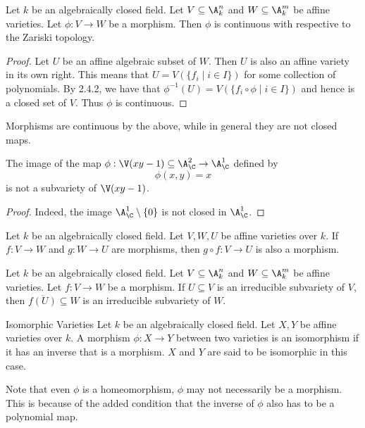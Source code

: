 \documentclass[a4paper]{article}
\begin{document}
\begin{prp}{}{} Let $k$ be an algebraically closed field. Let $V\subseteq\A_k^n$ and $W\subseteq\A_k^m$ be affine varieties. Let $\phi:V\to W$ be a morphism. Then $\phi$ is continuous with respective to the Zariski topology. \tcbline
\begin{proof}
Let $U$ be an affine algebraic subset of $W$. Then $U$ is also an affine variety in its own right. This means that $U=V(\{f_i\;|\;i\in I\})$ for some collection of polynomials. By 2.4.2, we have that $\phi^{-1}(U)=V(\{f_i\circ\phi\;|\;i\in I\})$ and hence is a closed set of $V$. Thus $\phi$ is continuous. 
\end{proof}
\end{prp}

Morphisms are continuous by the above, while in general they are not closed maps. 

\begin{eg}{}{} The image of the map $\phi:\V(xy-1)\subseteq\A_\C^2\to\A_\C^1$ defined by $$\phi(x,y)=x$$ is not a subvariety of $\V(xy-1)$. \tcbline
\begin{proof}
Indeed, the image $\A_\C^1\setminus\{0\}$ is not closed in $\A_\C^1$.
\end{proof}
\end{eg}

\begin{prp}{}{} Let $k$ be an algebraically closed field. Let $V,W,U$ be affine varieties over $k$. If $f:V\to W$ and $g:W\to U$ are morphisms, then $g\circ f:V\to U$ is also a morphism. 
\end{prp}

\begin{lmm}{}{} Let $k$ be an algebraically closed field. Let $V\subseteq\A_k^n$ and $W\subseteq\A_k^m$ be affine varieties. Let $f:V\to W$ be a morphism. If $U\subseteq V$ is an irreducible subvariety of $V$, then $\overline{f(U)}\subseteq W$ is an irreducible subvariety of $W$. 
\end{lmm}

\begin{defn}{Isomorphic Varieties}{} Let $k$ be an algebraically closed field. Let $X,Y$ be affine varieties over $k$. A morphism $\phi:X\to Y$ between two varieties is an isomorphism if it has an inverse that is a morphism. $X$ and $Y$ are said to be isomorphic in this case. 
\end{defn}

Note that even $\phi$ is a homeomorphism, $\phi$ may not necessarily be a morphism. This is because of the added condition that the inverse of $\phi$ also has to be a polynomial map. 
\end{document}
